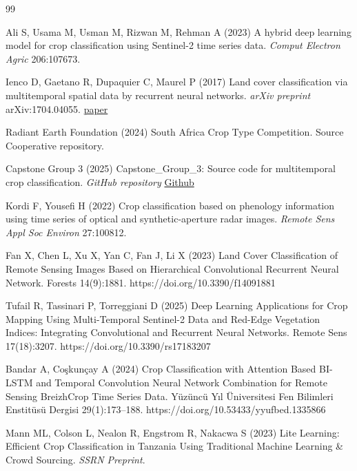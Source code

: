 \documentclass[pdflatex,sn-mathphys]{sn-jnl} %
\begin{document}
\begin{thebibliography}{99}


Ali S, Usama M, Usman M, Rizwan M, Rehman A (2023) A hybrid deep learning model for crop classification using Sentinel-2 time series data. \textit{Comput Electron Agric} 206:107673.

Ienco D, Gaetano R, Dupaquier C, Maurel P (2017) Land cover classification via 
multitemporal spatial data by recurrent neural networks. \textit{arXiv preprint} 
arXiv:1704.04055. \href{https://arxiv.org/abs/1704.04055}{paper}

Radiant Earth Foundation (2024) South Africa Crop Type Competition. Source Cooperative repository.

Capstone Group 3 (2025) Capstone\_Group\_3: Source code for multitemporal crop classification. \textit{GitHub repository}
\href{https://github.com/DishaKacha7/Capstone_Group_3}{Github}

Kordi F, Yousefi H (2022) Crop classification based on phenology information using time series of optical and synthetic-aperture radar images. \textit{Remote Sens Appl Soc Environ} 27:100812.


Fan X, Chen L, Xu X, Yan C, Fan J, Li X (2023) Land Cover Classification of Remote Sensing Images Based on Hierarchical Convolutional Recurrent Neural Network. Forests 14(9):1881. https://doi.org/10.3390/f14091881

Tufail R, Tassinari P, Torreggiani D (2025) Deep Learning Applications for Crop Mapping Using Multi-Temporal Sentinel-2 Data and Red-Edge Vegetation Indices: Integrating Convolutional and Recurrent Neural Networks. Remote Sens 17(18):3207. https://doi.org/10.3390/rs17183207

Bandar A, Co\c{s}kun\c{c}ay A (2024) Crop Classification with Attention Based BI-LSTM and Temporal Convolution Neural Network Combination for Remote Sensing BreizhCrop Time Series Data. Y\"uz\"unc\"u Y{\i}l \"Universitesi Fen Bilimleri Enstit\"us\"u Dergisi 29(1):173--188. https://doi.org/10.53433/yyufbed.1335866

Mann ML, Colson L, Nealon R, Engstrom R, Nakacwa S (2023) Lite Learning: Efficient Crop Classification in Tanzania Using Traditional Machine Learning \& Crowd Sourcing. \textit{SSRN Preprint}.


\end{thebibliography}
\end{document}
